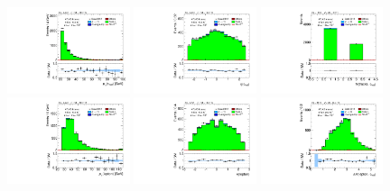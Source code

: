 \clearpage
\begin{figure}[tp]
  \centering
  \includegraphics[width=0.32\textwidth]{figures/analysis/vbf-QCDCR/tau-pt}
  \includegraphics[width=0.32\textwidth]{figures/analysis/vbf-QCDCR/tau-eta}
  \includegraphics[width=0.32\textwidth]{figures/analysis/vbf-QCDCR/tau-numTrack}
  \includegraphics[width=0.32\textwidth]{figures/analysis/vbf-QCDCR/lep-pt-hi}
  \includegraphics[width=0.32\textwidth]{figures/analysis/vbf-QCDCR/lep-eta}
  \includegraphics[width=0.32\textwidth]{figures/analysis/vbf-QCDCR/taulep-dR}

\end{figure}
